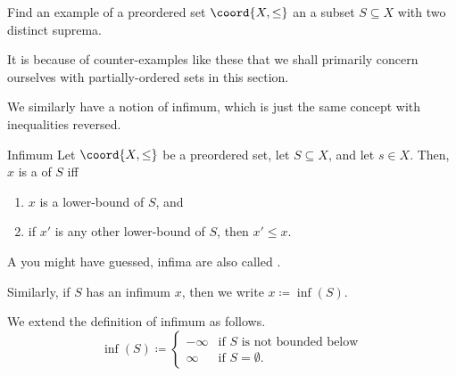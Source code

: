 \begin{exr}{}{}
Find an example of a preordered set $\coord{X,\leq}$ an a subset $S\subseteq X$ with two distinct suprema.
\begin{rmk}
It is because of counter-examples like these that we shall primarily concern ourselves with partially-ordered sets in this section.
\end{rmk}
\end{exr}
We similarly have a notion of infimum, which is just the same concept with inequalities reversed.
\begin{dfn}{Infimum}{}
Let $\coord{X,\leq}$ be a preordered set, let $S\subseteq X$, and let $s\in X$.  Then, $x$ is a  of $S$ iff
\begin{enumerate}
\item $x$ is a lower-bound of $S$, and
\item if $x'$ is any other lower-bound of $S$, then $x'\leq x$.
\end{enumerate}
\begin{rmk}
A you might have guessed, infima are also called .
\end{rmk}
\begin{rmk}
Similarly, if $S$ has an infimum $x$, then we write $x\coloneqq \inf (S)$.
\end{rmk}
We extend the definition of infimum as follows.
\begin{equation}
\inf (S)\coloneqq \begin{cases}-\infty & \text{if }S\text{ is not bounded below} \\ \infty & \text{if }S=\emptyset .\end{cases}
\end{equation}
\end{dfn}

